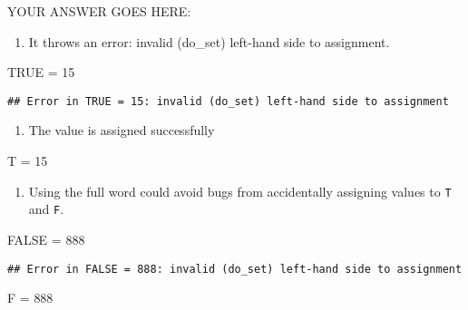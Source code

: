 \documentclass[
]{article}
\newenvironment{Shaded}{\begin{snugshade}}{\end{snugshade}}
\newcommand{\DecValTok}[1]{\textcolor[rgb]{0.00,0.00,0.81}{#1}}
\newcommand{\NormalTok}[1]{#1}
\newcommand{\OtherTok}[1]{\textcolor[rgb]{0.56,0.35,0.01}{#1}}
\newcommand{\StringTok}[1]{\textcolor[rgb]{0.31,0.60,0.02}{#1}}
\providecommand{\tightlist}{%
  \setlength{\itemsep}{0pt}\setlength{\parskip}{0pt}}
\begin{document}
YOUR ANSWER GOES HERE:

\begin{enumerate}
\def\labelenumi{\arabic{enumi}.}
\tightlist
\item
  It throws an error: invalid (do\_set) left-hand side to assignment.
\end{enumerate}

\begin{Shaded}
\begin{Highlighting}[]
\OtherTok{TRUE}\NormalTok{ =}\StringTok{ }\DecValTok{15}
\end{Highlighting}
\end{Shaded}

\begin{verbatim}
## Error in TRUE = 15: invalid (do_set) left-hand side to assignment
\end{verbatim}

\begin{enumerate}
\def\labelenumi{\arabic{enumi}.}
\setcounter{enumi}{1}
\tightlist
\item
  The value is assigned successfully
\end{enumerate}

\begin{Shaded}
\begin{Highlighting}[]
\NormalTok{T =}\StringTok{ }\DecValTok{15}
\end{Highlighting}
\end{Shaded}

\begin{enumerate}
\def\labelenumi{\arabic{enumi}.}
\setcounter{enumi}{2}
\tightlist
\item
  Using the full word could avoid bugs from accidentally assigning
  values to \texttt{T} and \texttt{F}.
\end{enumerate}

\begin{Shaded}
\begin{Highlighting}[]
\OtherTok{FALSE}\NormalTok{ =}\StringTok{ }\DecValTok{888}
\end{Highlighting}
\end{Shaded}

\begin{verbatim}
## Error in FALSE = 888: invalid (do_set) left-hand side to assignment
\end{verbatim}

\begin{Shaded}
\begin{Highlighting}[]
\NormalTok{F =}\StringTok{ }\DecValTok{888}
\end{Highlighting}
\end{Shaded}
\end{document}
